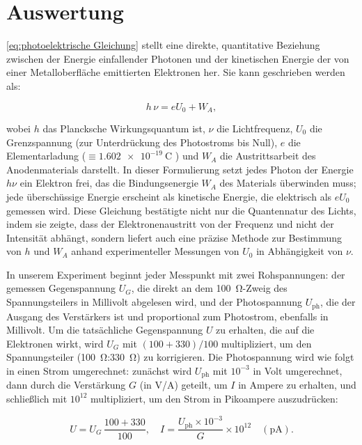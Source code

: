 \section{Auswertung}
\cref{eq:photoelektrische Gleichung} stellt eine direkte, quantitative Beziehung zwischen der Energie einfallender Photonen und der kinetischen Energie der von einer Metalloberfläche emittierten Elektronen her. Sie kann geschrieben werden als:

\begin{equation}
    h\,\nu = e U_{0} + W_{A},
\end{equation}

wobei $h$ das Plancksche Wirkungsquantum ist, $\nu$ die Lichtfrequenz, $U_{0}$ die Grenzspannung (zur Unterdrückung des Photostroms bis Null), $e$ die Elementarladung ($\equiv \SI{1.602e-19}{\coulomb}$ \cite{codata}) und $W_{A}$ die Austrittsarbeit des Anodenmaterials darstellt. In dieser Formulierung setzt jedes Photon der Energie $h\nu$ ein Elektron frei, das die Bindungsenergie $W_{A}$ des Materials überwinden muss; jede überschüssige Energie erscheint als kinetische Energie, die elektrisch als $eU_{0}$ gemessen wird. Diese Gleichung bestätigte nicht nur die Quanten­natur des Lichts, indem sie zeigte, dass der Elektronenaustritt von der Frequenz und nicht der Intensität abhängt, sondern liefert auch eine präzise Methode zur Bestimmung von $h$ und $W_{A}$ anhand experimenteller Messungen von $U_{0}$ in Abhängigkeit von $\nu$.

In unserem Experiment beginnt jeder Messpunkt mit zwei Rohspannungen: der gemessen Gegenspannung $U_{G}$, die direkt an dem \SI{100}{\ohm}-Zweig des Spannungsteilers in Millivolt abgelesen wird, und der Photospannung $U_{\mathrm{ph}}$, die der Ausgang des Verstärkers ist und proportional zum Photostrom, ebenfalls in Millivolt. Um die tatsächliche Gegenspannung $U$ zu erhalten, die auf die Elektronen wirkt, wird $U_{G}$ mit $(100+330)/100$ multipliziert, um den Spannungsteiler (\SI{100}{\ohm}:\SI{330}{\ohm}) zu korrigieren. Die Photospannung wird wie folgt in einen Strom umgerechnet: zunächst wird $U_{\mathrm{ph}}$ mit $10^{-3}$ in Volt umgerechnet, dann durch die Verstärkung $G$ (in V/A) geteilt, um $I$ in Ampere zu erhalten, und schließlich mit $10^{12}$ multipliziert, um den Strom in Pikoampere auszudrücken:

\begin{equation}
  U = U_{G}\,\frac{100 + 330}{100},\quad
  I = \frac{U_{\mathrm{ph}}\times10^{-3}}{G}\times10^{12}
  \quad(\mathrm{pA}).
\end{equation}

